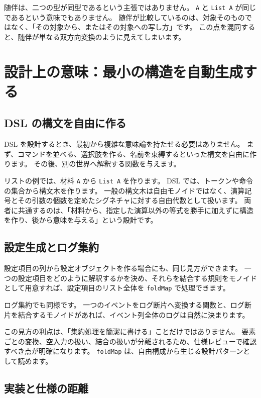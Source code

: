 随伴は、二つの型が同型であるという主張ではありません。
\texttt{A} と \texttt{List A} が同じであるという意味でもありません。
随伴が比較しているのは、対象そのものではなく、「その対象から、またはその対象への写し方」です。
この点を混同すると、随伴が単なる双方向変換のように見えてしまいます。

\section{設計上の意味：最小の構造を自動生成する}
\label{sec:ch37-design}

\subsection{DSL の構文を自由に作る}

DSL を設計するとき、最初から複雑な意味論を持たせる必要はありません。
まず、コマンドを並べる、選択肢を作る、名前を束縛するといった構文を自由に作ります。
その後、別の世界へ解釈する関数を与えます。

リストの例では、材料 \texttt{A} から \texttt{List A} を作ります。
DSL では、トークンや命令の集合から構文木を作ります。
一般の構文木は自由モノイドではなく、演算記号とその引数の個数を定めたシグネチャに対する自由代数として扱います。
両者に共通するのは、「材料から、指定した演算以外の等式を勝手に加えずに構造を作り、後から意味を与える」という設計です。

\subsection{設定生成とログ集約}

設定項目の列から設定オブジェクトを作る場合にも、同じ見方ができます。
一つの設定項目をどのように解釈するかを決め、それらを結合する規則をモノイドとして用意すれば、設定項目のリスト全体を \texttt{foldMap} で処理できます。

ログ集約でも同様です。
一つのイベントをログ断片へ変換する関数と、ログ断片を結合するモノイドがあれば、イベント列全体のログは自然に決まります。

この見方の利点は、「集約処理を簡潔に書ける」ことだけではありません。
要素ごとの変換、空入力の扱い、結合の扱いが分離されるため、仕様レビューで確認すべき点が明確になります。
\texttt{foldMap} は、自由構成から生じる設計パターンとして読めます。

\subsection{実装と仕様の距離}


